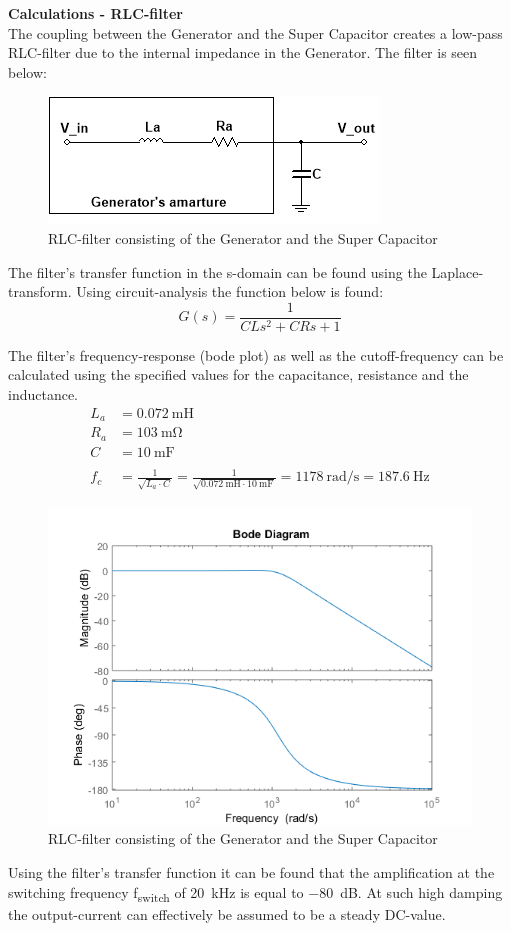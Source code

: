 \textbf{Calculations - RLC-filter}\\
The coupling between the Generator and the Super Capacitor creates a low-pass RLC-filter due to the internal impedance in the Generator\cite{Maxon}. The filter is seen below:

\begin{figure}[H]
	\centering
	\includegraphics[width=0.5\linewidth]{Hardware/LoadSystem/RLC_filter}
	\caption{RLC-filter consisting of the Generator and the Super Capacitor}
	\label{fig:RLC_filter}
\end{figure}

The filter's transfer function in the s-domain can be found using the Laplace-transform. Using circuit-analysis the function below is found: 
\begin{equation}
	G(s) = \frac{1}{CLs^2 + CRs + 1}
\end{equation}

 The filter's frequency-response (bode plot) as well as the cutoff-frequency can be calculated using the specified values for the capacitance, resistance and the inductance.
\begin{equation}
	\begin{split}
		L_a &= \SI{0.072}{\milli \henry}\\
		R_a &= \SI{103}{\milli \ohm}\\
		C &= \SI{10}{\milli \farad}\\
		\\
		f_c &= \frac{1}{\sqrt{L_a \cdot C}} = \frac{1}{\sqrt{\SI{0.072}{\milli \henry} \cdot \SI{10}{\milli \farad}}} = \SI[per-mode=fraction]{1178}{\radian \per \second} = \SI{187.6}{\hertz}
	\end{split}
\end{equation}

\begin{figure}[H]
	\centering
	\includegraphics[width=0.7\linewidth]{Hardware/LoadSystem/BodeFilter}
	\caption{RLC-filter consisting of the Generator and the Super Capacitor}
	\label{fig:RLC_filter}
\end{figure}

Using the filter's transfer function it can be found that the amplification at the switching frequency f\textsubscript{switch} of \SI{20}{\kilo \hertz} is equal to \SI{-80}{dB}. At such high damping the output-current can effectively be assumed to be a steady DC-value.